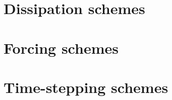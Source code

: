 \section{Dissipation schemes} 
\label{ssec_Dschemes}

\section{Forcing schemes}
\label{ssec_Fschemes}

\section{Time-stepping schemes}
\label{ssec_Tschemes}
